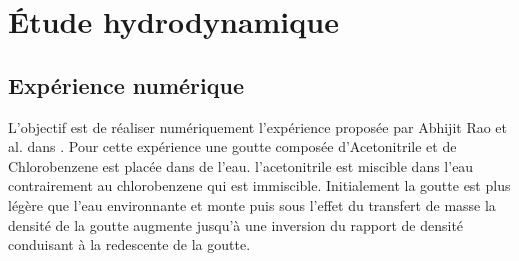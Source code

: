 
\chapter{Étude hydrodynamique}
\section{Expérience numérique}

L'objectif est de réaliser numériquement l'expérience proposée par Abhijit Rao et al. dans \cite{rao_influence_2015}. Pour cette expérience une goutte composée d'Acetonitrile et de Chlorobenzene est placée dans de l'eau. l'acetonitrile est miscible dans l'eau contrairement au chlorobenzene qui est immiscible. Initialement la goutte est plus légère que l'eau environnante et monte puis sous l'effet du transfert de masse la densité de la goutte augmente jusqu’à une inversion du rapport de densité conduisant à la redescente de la goutte.
